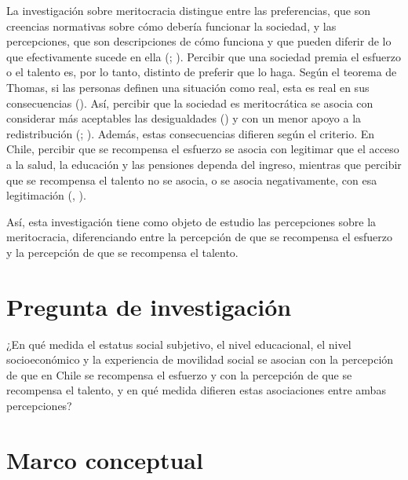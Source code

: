 \documentclass[
  spanish,
  a4paper,
  oneside]{scrbook}
\begin{document}
La investigación sobre meritocracia distingue entre las preferencias,
que son creencias normativas sobre cómo debería funcionar la sociedad, y
las percepciones, que son descripciones de cómo funciona y que pueden
diferir de lo que efectivamente sucede en ella
(;
).
Percibir que una sociedad premia el esfuerzo o el talento es, por lo
tanto, distinto de preferir que lo haga. Según el teorema de Thomas, si
las personas definen una situación como real, esta es real en sus
consecuencias ().
Así, percibir que la sociedad es meritocrática se asocia con considerar
más aceptables las desigualdades () y con un menor apoyo a la redistribución
(;
). Además, estas consecuencias difieren según el criterio. En
Chile, percibir que se recompensa el esfuerzo se asocia con legitimar
que el acceso a la salud, la educación y las pensiones dependa del
ingreso, mientras que percibir que se recompensa el talento no se
asocia, o se asocia negativamente, con esa legitimación
(,
).

Así, esta investigación tiene como objeto de estudio las percepciones
sobre la meritocracia, diferenciando entre la percepción de que se
recompensa el esfuerzo y la percepción de que se recompensa el talento.

\section{Pregunta de investigación}\label{pregunta-de-investigaciuxf3n}

¿En qué medida el estatus social subjetivo, el nivel educacional, el
nivel socioeconómico y la experiencia de movilidad social se asocian con
la percepción de que en Chile se recompensa el esfuerzo y con la
percepción de que se recompensa el talento, y en qué medida difieren
estas asociaciones entre ambas percepciones?

\section{Marco conceptual}\label{marco-conceptual}
\end{document}
